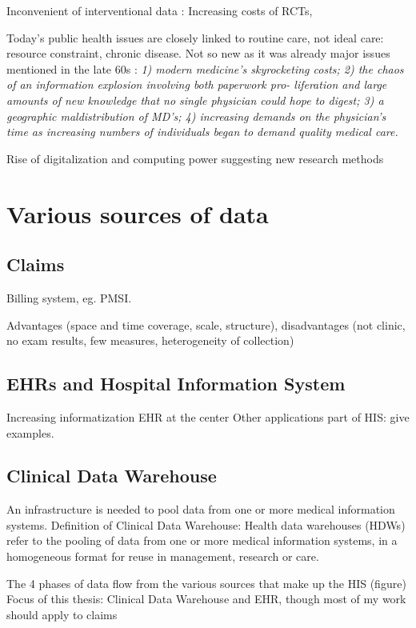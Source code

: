 \documentclass{report}
\begin{document}
Inconvenient of interventional data : Increasing costs of RCTs,

Today's public health issues are closely linked to routine care, not ideal care:
resource constraint, chronic disease. Not so new as it was already major issues
mentioned in the late 60s \cite{rutstein1967coming}: \textit{1) modern
  medicine's skyrocketing costs; 2) the chaos of an information explosion
  involving both paperwork pro- liferation and large amounts of new knowledge that
  no single physician could hope to digest; 3) a geographic maldistribution of
  MD's; 4) increasing demands on the physician's time as increasing numbers of
  individuals began to demand quality medical care.}

Rise of digitalization and computing power suggesting new research methods


\section{Various sources of data}\label{sec:intro:sources}

\subsection{Claims}\label{subsec:intro:claims}

Billing system, eg. PMSI.

Advantages (space and time coverage, scale, structure), disadvantages (not clinic, no exam results, few measures, heterogeneity of collection)

\subsection{EHRs and Hospital Information System}\label{subsec:intro:EHRs}

Increasing informatization
EHR at the center
Other applications part of HIS: give examples.

\subsection{Clinical Data Warehouse}\label{subsec:intro:cdw} An infrastructure
is needed to pool data from one or more medical information systems. Definition
of Clinical Data Warehouse: Health data warehouses (HDWs) refer to the pooling of
data from one or more medical information systems, in a homogeneous format for
reuse in management, research or care.


The 4 phases of data flow from the various sources that make up the HIS (figure)
Focus of this thesis: Clinical Data Warehouse and EHR, though most of my work should apply to claims
\end{document}

